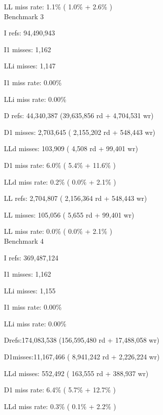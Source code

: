 \documentclass{article}
\begin{document}
\begin{multicols}{2}
        LL miss rate:      1.1\% (   1.0\%     +    2.6\%  )\\
        
        
        Benchmark 3

        I   refs:      94,490,943
        
        I1  misses:         1,162
        
        LLi misses:         1,147
        
        I1  miss rate:       0.00\%
        
        LLi miss rate:       0.00\%
        
        D   refs:      44,340,387  (39,635,856 rd   + 4,704,531 wr)
        
        D1  misses:     2,703,645  ( 2,155,202 rd   +   548,443 wr)
        
        LLd misses:       103,909  (     4,508 rd   +    99,401 wr)
        
        D1  miss rate:        6.0\% (       5.4\%     +      11.6\%  )
        
        LLd miss rate:        0.2\% (       0.0\%     +       2.1\%  )
        
        LL refs:        2,704,807  ( 2,156,364 rd   +   548,443 wr)
        
        LL misses:        105,056  (     5,655 rd   +    99,401 wr)
        
        LL miss rate:         0.0\% (       0.0\%     +       2.1\%  )\\
        
        
        Benchmark 4

        I   refs:      369,487,124
        
        I1  misses:          1,162
        
        LLi misses:          1,155
        
        I1  miss rate:        0.00\%
        
        LLi miss rate:        0.00\%
        
        Drefs:174,083,538  (156,595,480 rd   + 17,488,058 wr)
        
        D1misses:11,167,466  (  8,941,242 rd   +  2,226,224 wr)
        
        LLd misses:        552,492  (    163,555 rd   +    388,937 wr)
        
        D1  miss rate:         6.4\% (        5.7\%     +       12.7\%  )
        
        LLd miss rate:         0.3\% (        0.1\%     +        2.2\%  )
        

\end{multicols}
\end{document}
